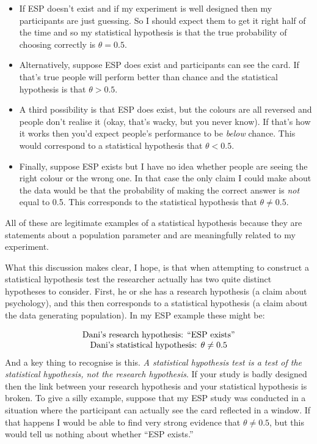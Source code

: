 \documentclass[
]{book}
\providecommand{\tightlist}{%
  \setlength{\itemsep}{0pt}\setlength{\parskip}{0pt}}
\begin{document}
\begin{itemize}
\tightlist
\item
  If ESP doesn't exist and if my experiment is well designed then my participants are just guessing. So I should expect them to get it right half of the time and so my statistical hypothesis is that the true probability of choosing correctly is \(\theta = 0.5\).
\item
  Alternatively, suppose ESP does exist and participants can see the card. If that's true people will perform better than chance and the statistical hypothesis is that \(\theta > 0.5\).
\item
  A third possibility is that ESP does exist, but the colours are all reversed and people don't realise it (okay, that's wacky, but you never know). If that's how it works then you'd expect people's performance to be \emph{below} chance. This would correspond to a statistical hypothesis that \(\theta < 0.5\).
\item
  Finally, suppose ESP exists but I have no idea whether people are seeing the right colour or the wrong one. In that case the only claim I could make about the data would be that the probability of making the correct answer is \emph{not} equal to 0.5. This corresponds to the statistical hypothesis that \(\theta \neq 0.5\).
\end{itemize}

All of these are legitimate examples of a statistical hypothesis because they are statements about a population parameter and are meaningfully related to my experiment.

What this discussion makes clear, I hope, is that when attempting to construct a statistical hypothesis test the researcher actually has two quite distinct hypotheses to consider. First, he or she has a research hypothesis (a claim about psychology), and this then corresponds to a statistical hypothesis (a claim about the data generating population). In my ESP example these might be:

\[
\begin{array}{cc}
\mbox{Dani's research hypothesis: } ``\mbox{ESP exists}" \\
\mbox{Dani's statistical hypothesis: } \theta \neq 0.5 \\
\end{array}
\]
And a key thing to recognise is this. \emph{A statistical hypothesis test is a test of the statistical hypothesis, not the research hypothesis}. If your study is badly designed then the link between your research hypothesis and your statistical hypothesis is broken. To give a silly example, suppose that my ESP study was conducted in a situation where the participant can actually see the card reflected in a window. If that happens I would be able to find very strong evidence that \(\theta \neq 0.5\), but this would tell us nothing about whether ``ESP exists.''
\end{document}
